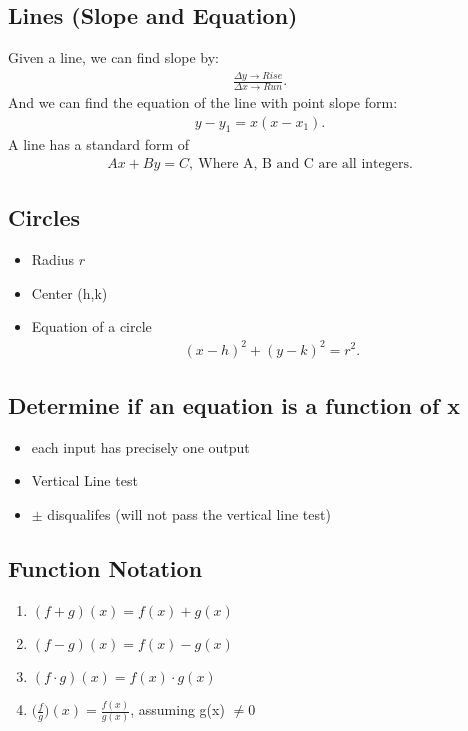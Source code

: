 \documentclass{report}
\begin{document}
      \bigbreak \noindent \bigbreak \noindent
      \subsection{Lines (Slope and Equation)}
      Given a line, we can find slope by:
      \begin{align*}
        \frac{\Delta y \rightarrow Rise}{\Delta x \rightarrow Run}
      .\end{align*}
      \bigbreak \noindent 
      And we can find the equation of the line with point slope form:
      \begin{align*}
        y-y_{1} = x(x-x_{1})
      .\end{align*}
      \bigbreak \noindent 
      A line has a standard form of
      \begin{align*}
        Ax + By = C,\ \text{Where A, B and C are all integers}
      .\end{align*}

      \bigbreak \noindent \bigbreak \noindent 
      \subsection{Circles}
      \begin{itemize}
        \item Radius $r$
        \item Center (h,k)
        \item Equation of a circle
          \begin{align*}
            (x-h)^{2} + (y-k)^{2} = r^{2}
          .\end{align*}
      \end{itemize}

    \bigbreak \noindent \bigbreak \noindent 
    \subsection{Determine if an equation is a function of x}
    \begin{itemize}
      \item each input has precisely one output
      \item Vertical Line test
      \item $\pm$ disqualifes (will not pass the vertical line test)
    \end{itemize}

        \bigbreak \noindent \bigbreak \noindent 
    \subsection{Function Notation}
    \begin{enumerate}
      \item $(f + g)(x) = f(x) + g(x)$
      \item $(f - g)(x) = f(x) - g(x)$
      \item $(f \cdot g)(x) = f(x) \cdot g(x)$
      \item $\bigg(\frac{f}{g}\bigg)(x) = \frac{f(x)}{g(x)}$, assuming g(x) $\neq 0$
    \end{enumerate}
\end{document}
